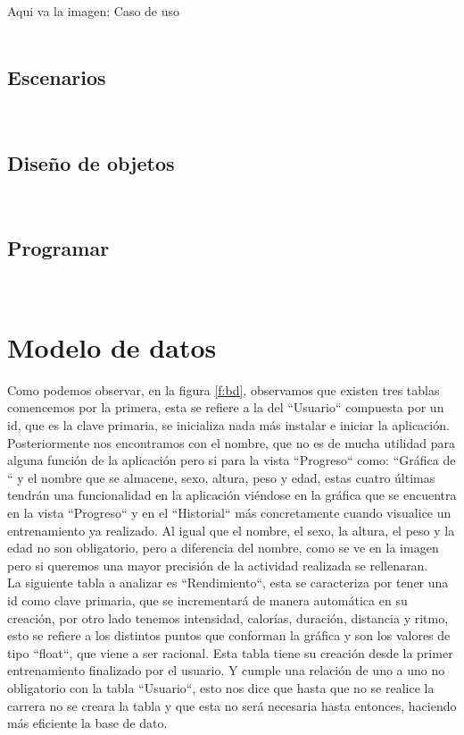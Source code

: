 \documentclass[a4paper, 11pt]{article}
\begin{document}
\begin{itemize}
          \\\\\textcolor[rgb]{1,0,0}{Aqui va la imagen: Caso de uso}\\\\

       \subsection{Escenarios}\\

       \subsection{Diseño de objetos}\\

       \subsection{Programar}\\

\section{Modelo de datos}

    Como podemos observar, en la figura \ref{f:bd}, observamos que existen tres tablas
    comencemos por la primera, esta se refiere a la del ``Usuario`` compuesta por un id, que
    es la clave primaria, se inicializa nada más instalar e iniciar la aplicación. Posteriormente
    nos encontramos con el nombre, que no es de mucha utilidad para alguna función de la aplicación
    pero si para la vista ``Progreso`` como: ``Gráfica de `` y el nombre que se almacene, sexo,
    altura, peso y edad, estas cuatro últimas tendrán una funcionalidad en la aplicación viéndose
    en la gráfica que se encuentra en la vista ``Progreso`` y en el ``Historial`` más concretamente
    cuando visualice un entrenamiento ya realizado. Al igual que el nombre, el sexo, la altura, el
    peso y la edad no son obligatorio, pero a diferencia del nombre, como se ve en la imagen pero
    si queremos una mayor precisión de la actividad realizada se rellenaran.\\

    La siguiente tabla a analizar es ``Rendimiento``, esta se caracteriza por tener una id como
    clave primaria, que se incrementará de manera automática en su creación, por otro lado tenemos
    intensidad, calorías, duración, distancia y ritmo, esto se refiere a los distintos puntos que
    conforman la gráfica y son los valores de tipo ``float``, que viene a ser racional. Esta tabla
    tiene su creación desde la primer entrenamiento finalizado por el usuario. Y cumple una relación
    de uno a uno no obligatorio con la tabla ``Usuario``, esto nos dice que hasta que no se realice
    la carrera no se creara la tabla y que esta no será necesaria hasta entonces, haciendo más eficiente
    la base de dato.\\


\end{itemize}
\end{document}
